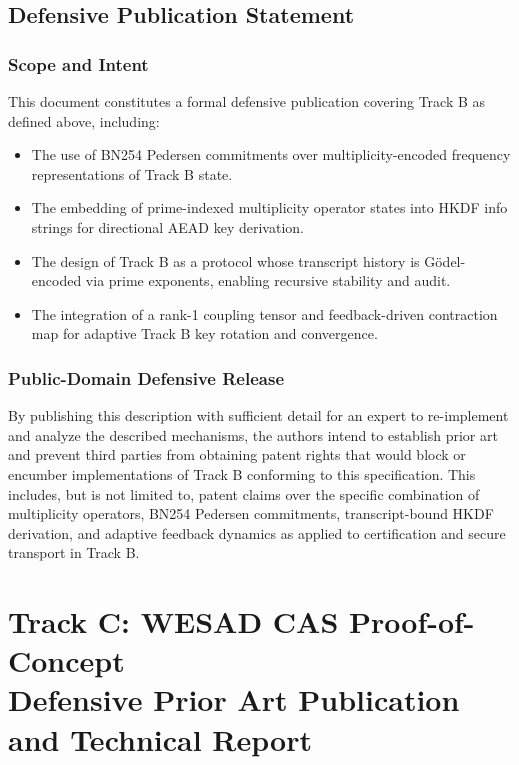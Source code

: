 \documentclass[11pt]{article}
\begin{document}
\subsection{Defensive Publication Statement}

\subsubsection*{Scope and Intent}

This document constitutes a formal defensive publication covering Track B as defined above, including:

\begin{itemize}[leftmargin=1.5em]
  \item The use of BN254 Pedersen commitments over multiplicity-encoded frequency representations of Track B state.
  \item The embedding of prime-indexed multiplicity operator states into HKDF info strings for directional AEAD key derivation.
  \item The design of Track B as a protocol whose transcript history is G\"odel-encoded via prime exponents, enabling recursive stability and audit.
  \item The integration of a rank-1 coupling tensor and feedback-driven contraction map for adaptive Track B key rotation and convergence.
\end{itemize}

\subsubsection*{Public-Domain Defensive Release}

By publishing this description with sufficient detail for an expert to re-implement and analyze the described mechanisms, the authors intend to establish prior art and prevent third parties from obtaining patent rights that would block or encumber implementations of Track B conforming to this specification.
This includes, but is not limited to, patent claims over the specific combination of multiplicity operators, BN254 Pedersen commitments, transcript-bound HKDF derivation, and adaptive feedback dynamics as applied to certification and secure transport in Track B.

\section{Track C: WESAD CAS Proof-of-Concept \\
Defensive Prior Art Publication and Technical Report}
\end{document}
